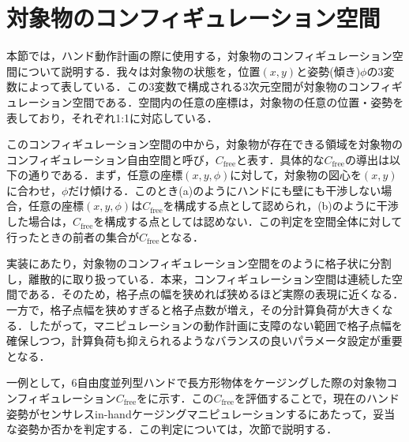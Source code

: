 \documentclass[a4paper,twoside,12pt,papersize, dvipdfmx]{iirthesis}
\begin{document}
\section{対象物のコンフィギュレーション空間}\label{sec::sicm::cspace}
本節では，ハンド動作計画の際に使用する，対象物のコンフィギュレーション空間について説明する．我々は対象物の状態を，位置$(x, y)$と姿勢(傾き)$\phi$の3変数によって表している．この3変数で構成される3次元空間が対象物のコンフィギュレーション空間である．空間内の任意の座標は，対象物の任意の位置・姿勢を表しており，それぞれ1:1に対応している．\par

このコンフィギュレーション空間の中から，対象物が存在できる領域を対象物のコンフィギュレーション自由空間と呼び，$C_{\mathrm{free}}$と表す．具体的な$C_{\mathrm{free}}$の導出は以下の通りである．まず，任意の座標$(x, y, \phi)$に対して，対象物の図心を$(x, y)$に合わせ，$\phi$だけ傾ける．このとき(a)のようにハンドにも壁にも干渉しない場合，任意の座標$(x, y, \phi)$は$C_{\mathrm{free}}$を構成する点として認められ，(b)のように干渉した場合は，$C_{\mathrm{free}}$を構成する点としては認めない．この判定を空間全体に対して行ったときの前者の集合が$C_{\mathrm{free}}$となる．\par

実装にあたり，対象物のコンフィギュレーション空間をのように格子状に分割し，離散的に取り扱っている．本来，コンフィギュレーション空間は連続した空間である．そのため，格子点の幅を狭めれば狭めるほど実際の表現に近くなる．一方で，格子点幅を狭めすぎると格子点数が増え，その分計算負荷が大きくなる．したがって，マニピュレーションの動作計画に支障のない範囲で格子点幅を確保しつつ，計算負荷も抑えられるようなバランスの良いパラメータ設定が重要となる．\par

一例として，6自由度並列型ハンドで長方形物体をケージングした際の対象物コンフィギュレーション$C_{\mathrm{free}}$をに示す．この$C_{\mathrm{free}}$を評価することで，現在のハンド姿勢がセンサレスin-handケージングマニピュレーションするにあたって，妥当な姿勢か否かを判定する．この判定については，次節で説明する．
\end{document}

